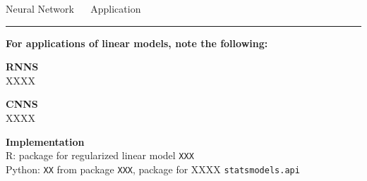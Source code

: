 \documentclass[11pt,compress,t,notes=noshow, xcolor=table]{beamer}
\begin{document}

\LARGE
\begin{frame}{\textcolor{gray!80}{Neural Network} ~~ Application}
\normalsize
\vspace{-0.5cm}
\noindent \textcolor{gray!80}{\rule{\textwidth}{1pt}}

\vspace{0.3cm}

\footnotesize

\textbf{For applications of linear models, note the following:}

\lz

  \textbf{\textcolor{gray!80}{RNNS}} \\
  \smallskip
 XXXX
 
 \textbf{\textcolor{gray!80}{CNNS}} \\
  \smallskip
 XXXX
 
 

\lz

  \textbf{\textcolor{gray!80}{Implementation}} \\
  \smallskip
  R: package for regularized linear model \texttt{XXX}\\
  Python: \texttt{XX} from package \texttt{XXX}, package for XXXX \texttt{statsmodels.api}

\end{frame}
\end{document}
